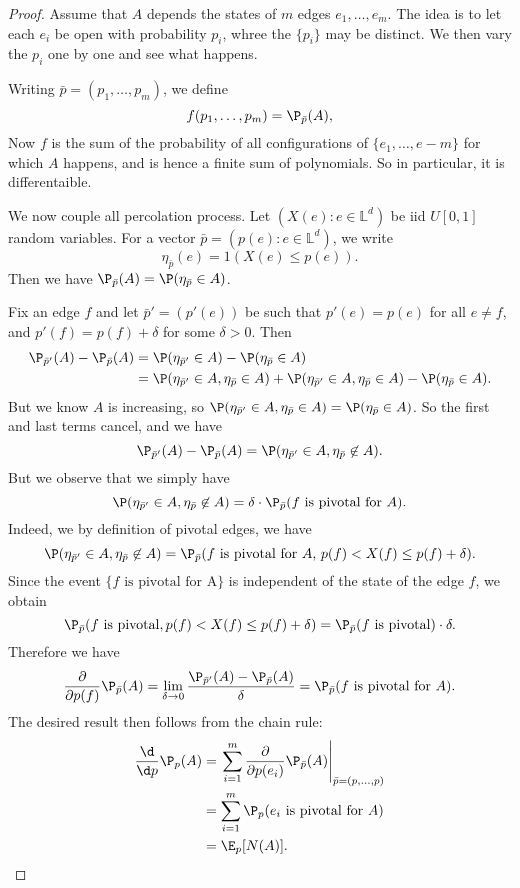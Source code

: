 \documentclass[a4paper]{article}
\renewcommand\L{\mathbb{L}}
\begin{document}
\begin{proof}
  Assume that $A$ depends the states of $m$ edges $e_1, \ldots, e_m$. The idea is to let each $e_i$ be open with probability $p_i$, whree the $\{p_i\}$ may be distinct. We then vary the $p_i$ one by one and see what happens.

  Writing $\bar{p} = (p_1, \ldots, p_m)$, we define
  \[
    f(p_1, \ldots, p_m) = \P_{\bar{p}} (A),
  \]
  Now $f$ is the sum of the probability of all configurations of $\{e_1, \ldots, e-m\}$ for which $A$ happens, and is hence a finite sum of polynomials. So in particular, it is differentaible.

  We now couple all percolation process. Let $(X(e): e \in \L^d)$ be iid $U[0, 1]$ random variables. For a vector $\bar{p} = (p(e): e \in \L^d)$, we write
  \[
    \eta_{\bar{p}}(e) = 1 (X(e) \leq p(e)).
  \]
  Then we have $\P_{\bar{p}}(A) = \P(\eta_{\bar{p}} \in A)$.

  Fix an edge $f$ and let $\bar{p}' = (p'(e))$ be such that $p'(e) = p(e)$ for all $e \not= f$, and $p'(f) = p(f) + \delta$ for some $\delta > 0$. Then
  \begin{align*}
    \P_{\bar{p}'}(A) - \P_{\bar{p}}(A) &= \P(\eta_{\bar{p}'} \in A) - \P(\eta_{\bar{p}} \in A)\\
    &= \P(\eta_{\bar{p}'} \in A, \eta_{\bar{p}} \in A) + \P(\eta_{\bar{p}'} \in A, \eta_{\bar{p}} \in A) - \P(\eta_{\bar{p}} \in A).
  \end{align*}
  But we know $A$ is increasing, so $\P(\eta_{\bar{p}'} \in A, \eta_{\bar{p}} \in A) = \P(\eta_{\bar{p}} \in A)$. So the first and last terms cancel, and we have
  \[
    \P_{\bar{p}'}(A) - \P_{\bar{p}}(A) = \P(\eta_{\bar{p}'} \in A, \eta_{\bar{p}} \not \in A).
  \]
  But we observe that we simply have
  \[
    \P (\eta_{\bar{p}'} \in A, \eta_{\bar{p}} \not \in A) = \delta \cdot \P_{\bar{p}} (f \text{ is pivotal for $A$}).
  \]
  Indeed, we by definition of pivotal edges, we have
  \[
    \P(\eta_{\bar{p}'} \in A, \eta_{\bar{p}} \not \in A) = \P_{\bar{p}}(f \text{ is pivotal for $A$, }p(f) < X(f) \leq p(f) + \delta).
  \]
  Since the event $\{f \text{ is pivotal for A}\}$ is independent of the state of the edge $f$, we obtain
  \[
    \P_{\bar{p}}(f\text{ is pivotal}, p(f) < X(f) \leq p(f) + \delta) = \P_{\bar{p}}(f\text{ is pivotal}) \cdot \delta.
  \]
  Therefore we have
  \[
    \frac{\partial}{\partial p(f)} \P_{\bar{p}}(A) = \lim_{\delta \to 0} \frac{\P_{\bar{p}'}(A) - \P_{\bar{p}}(A)}{\delta} = \P_{\bar{p}}(\text{$f$ is pivotal for $A$}).
  \]
  The desired result then follows from the chain rule:
  \begin{align*}
    \frac{\d}{\d p} \P_p(A) &= \left.\sum_{i = 1}^m \frac{\partial}{\partial p(e_i)} \P_{\bar{p}}(A)\right|_{\bar{p} = (p, \ldots, p)} \\
    &= \sum_{i = 1}^m \P_p(\text{$e_i$ is pivotal for $A$})\\
    &= \E_p[N(A)].
  \end{align*}
\end{proof}
\end{document}
